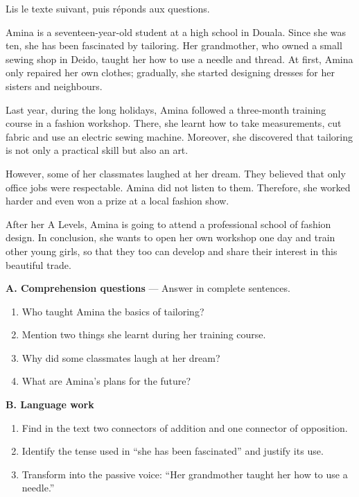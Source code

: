 \documentclass[11pt]{article}
\newcounter{popsec}
\newcounter{popsub}
\newcommand{\courssub}[1]{%
  \stepcounter{popsub}%
  \par\vspace{9pt}\noindent{\popxbold\fontsize{11.5}{13}\selectfont\color{popink}{\color{poporange}\thepopsec.\thepopsub}\hspace{6pt}#1}\par\nopagebreak\vspace{4pt}
}
\begin{document}
\courssub{Je me prépare au Bac}

\begin{exercice}
Lis le texte suivant, puis réponds aux questions.

\begin{textebox}
Amina is a seventeen-year-old student at a high school in Douala. Since she was ten, she has been fascinated by tailoring. Her grandmother, who owned a small sewing shop in Deido, taught her how to use a needle and thread. At first, Amina only repaired her own clothes; gradually, she started designing dresses for her sisters and neighbours.

Last year, during the long holidays, Amina followed a three-month training course in a fashion workshop. There, she learnt how to take measurements, cut fabric and use an electric sewing machine. Moreover, she discovered that tailoring is not only a practical skill but also an art.

However, some of her classmates laughed at her dream. They believed that only office jobs were respectable. Amina did not listen to them. Therefore, she worked harder and even won a prize at a local fashion show.

After her A Levels, Amina is going to attend a professional school of fashion design. In conclusion, she wants to open her own workshop one day and train other young girls, so that they too can develop and share their interest in this beautiful trade.
\end{textebox}

\textbf{A. Comprehension questions} — Answer in complete sentences.
\begin{enumerate}
\item Who taught Amina the basics of tailoring?
\item Mention two things she learnt during her training course.
\item Why did some classmates laugh at her dream?
\item What are Amina's plans for the future?
\end{enumerate}

\textbf{B. Language work}
\begin{enumerate}
\item Find in the text two connectors of addition and one connector of opposition.
\item Identify the tense used in “she has been fascinated” and justify its use.
\item Transform into the passive voice: “Her grandmother taught her how to use a needle.”
\end{enumerate}
\end{exercice}
\end{document}
